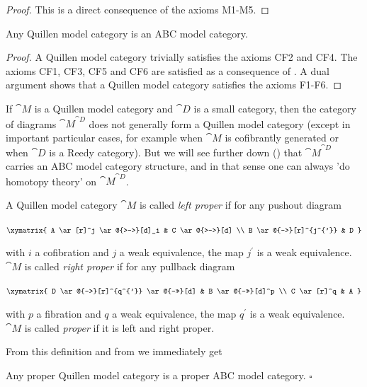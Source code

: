 \begin{proof}
This is a direct consequence of the axioms M1-M5.
\end{proof}

\begin{prop}
\label{prop:relclosedmodcat}
Any Quillen model category is an ABC model category. 
\end{prop}

\begin{proof} A Quillen model category trivially satisfies the axioms CF2 and CF4. The axioms CF1, CF3, CF5 and CF6 are satisfied as a consequence of . A dual argument shows that a Quillen model category satisfies the axioms F1-F6.
\end{proof}

If ${\cat M}$ is a Quillen model category and ${\cat D}$ is a small category, then the category of diagrams ${\cat M}^{\cat D}$ does not generally form a Quillen model category (except in important particular cases, for example when ${\cat M}$ is cofibrantly generated or when ${\cat D}$ is a Reedy category). But we will see further down () that ${\cat M}^{\cat D}$ carries an ABC model category structure, and in that sense one can always 'do homotopy theory' on ${\cat M}^{\cat D}$.

A Quillen model category ${\cat M}$ is called {\it left proper} if for any pushout diagram
\begin{center}
$ \xymatrix {
	A \ar[r]^j \ar@{>->}[d]_i &
	C \ar@{>-->}[d] \\
	B \ar@{-->}[r]^{j^{'}} &
	D
	}$
\end{center}
with $i$ a cofibration and $j$ a weak equivalence, the map $j^{'}$ is a weak equivalence. ${\cat M}$ is called {\it right proper} if for any pullback diagram
\begin{center}
$ \xymatrix {
	D \ar@{-->}[r]^{q^{'}} \ar@{-->>}[d] &
	B \ar@{->>}[d]^p \\
	C \ar[r]^q &
	A
	}$
\end{center}
with $p$ a fibration and $q$ a weak equivalence, the map $q^{'}$ is a weak equivalence. ${\cat M}$ is called {\it proper} if it is left and right proper.

From this definition and from  we immediately get
\begin{prop}
\label{prop:relproperclosedmodcat}
Any proper Quillen model category is a proper ABC model category. $\square$
\end{prop}

